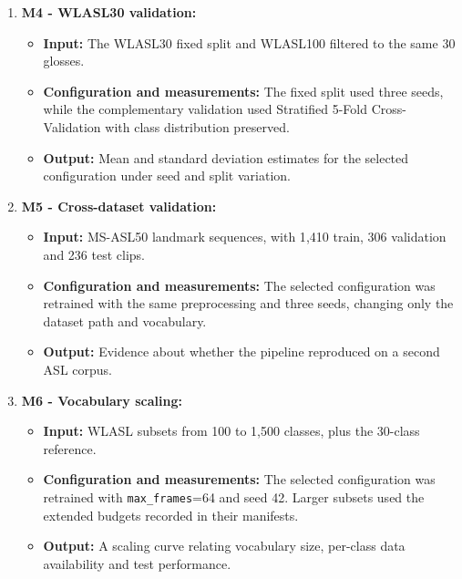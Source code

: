 \begin{enumerate}
    \item \textbf{M4 - WLASL30 validation:}
          \begin{itemize}
              \item \textbf{Input:} The WLASL30 fixed split and WLASL100 filtered to the same 30
                    glosses.
              \item \textbf{Configuration and measurements:} The fixed split used three seeds,
                    while the complementary validation used Stratified 5-Fold Cross-Validation with
                    class distribution preserved.
              \item \textbf{Output:} Mean and standard deviation estimates for the selected
                    configuration under seed and split variation.
          \end{itemize}

    \item \textbf{M5 - Cross-dataset validation:}
          \begin{itemize}
              \item \textbf{Input:} MS-ASL50 landmark sequences, with 1{,}410 train, 306 validation
                    and 236 test clips.
              \item \textbf{Configuration and measurements:} The selected configuration was
                    retrained with the same preprocessing and three seeds, changing only the
                    dataset path and vocabulary.
              \item \textbf{Output:} Evidence about whether the pipeline reproduced on a second
                    ASL corpus.
          \end{itemize}

    \item \textbf{M6 - Vocabulary scaling:}
          \begin{itemize}
              \item \textbf{Input:} WLASL subsets from 100 to 1{,}500 classes, plus the 30-class
                    reference.
              \item \textbf{Configuration and measurements:} The selected configuration was
                    retrained with \texttt{max\_frames}=64 and seed 42. Larger subsets used the
                    extended budgets recorded in their manifests.
              \item \textbf{Output:} A scaling curve relating vocabulary size, per-class data
                    availability and test performance.
          \end{itemize}


\end{enumerate}

